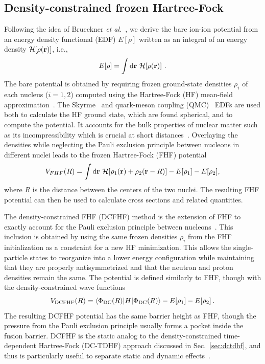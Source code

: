 \subsection{Density-constrained frozen Hartree-Fock}\label{sec:dcfhf}
Following the idea of Brueckner \textit{et al.}~\protect\citep{brueckner1968}, we derive the bare ion-ion potential from an energy density functional (EDF)  $E[\rho]$
written as an integral of an energy density ${\mathcal{H}}[\rho({\bf r})]$, i.e.,
\begin{equation}
E[\rho]=\int {\mbox d}{\bf r} \,\, {\mathcal{H}}[\rho({\bf r})]~.
\end{equation}
The bare potential is obtained by requiring frozen ground-state densities $\rho_{i}$ of each nucleus ($i=1,2$) computed using the Hartree-Fock (HF) mean-field approximation~\protect\citep{hartree1928,fock1930}.
The Skyrme~\protect\citep{skyrme1956} and quark-meson coupling (QMC)~\protect\citep{stone2016} EDFs are used both to calculate the HF ground state, which are found spherical, and to compute the potential.
It accounts for the bulk properties of nuclear matter such as its incompressibility which is crucial at short distances~\protect\citep{brueckner1968,misicu2006,hossain2015}.
Overlaying the densities while neglecting the Pauli exclusion principle between nucleons in different nuclei
leads to the frozen Hartree-Fock (FHF) potential~\protect\citep{washiyama2008,simenel2008,simenel2012}
\begin{equation}
V_{FHF}(R)=\int {\mbox d}{\bf r} \,\, {\mathcal{H}}[\rho_1({\bf r})+\rho_2({\bf r}-R)] - E[\rho_1] -E[\rho_2],
\label{eq:frozen}
\end{equation}
where $R$ is the distance between the centers of the two nuclei.
The resulting FHF potential can then be used to calculate cross sections and related quantities.

The density-constrained FHF (DCFHF) method is the extension of FHF to exactly account for the Pauli exclusion principle between nucleons~\protect\citep{simenel2017}.
This inclusion is obtained by using the same frozen densities $\rho_{i}$ from the FHF initialization as a constraint for a new HF minimization.
This allows the single-particle states to reorganize into a lower energy configuration while maintaining that they are properly antisymmetrized and that the neutron and proton densities remain the same.
The potential is defined similarly to FHF, though with the density-constrained wave functions~\protect\citep{simenel2017}
\begin{equation}
V_{\mathrm{DCFHF}}(R)=\langle\Phi_{\mathrm{DC}}(R) | H | \Phi_{\mathrm{DC}}(R) \rangle-E[\rho_1]-E[\rho_2]\,.
\end{equation}
The resulting DCFHF potential has the same barrier height as FHF, though the pressure from the Pauli exclusion principle usually forms a pocket inside the fusion barrier.
DCFHF is the static analog to the density-constrained time-dependent Hartree-Fock (DC-TDHF) approach discussed in Sec.~\ref{sec:dctdhf}, and thus is particularly useful to separate static and dynamic effects~\protect\citep{vophuoc2016}.




